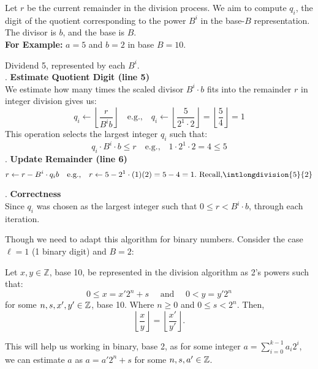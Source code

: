 \newpage

\begin{Proof}
    
    Let $r$ be the current remainder in the division process. We aim to compute $q_i$, the digit of the quotient corresponding to the power $B^i$ in the base-$B$ representation. The divisor is $b$, and the base is $B$.\\

    \noindent
    \textbf{For Example:} $a = 5$ and $b = 2$ in base $B = 10$.

    \noindent
    Dividend 5, represented by each $B^i$.\\

    . \textbf{Estimate Quotient Digit (line 5)}\\
    We estimate how many times the scaled divisor $B^i \cdot b$ fits into the remainder $r$ in integer division gives us:
    \[
    q_i \gets \left\lfloor \frac{r}{B^i b} \right\rfloor \quad \text{e.g.,} \quad q_i \gets \left\lfloor \frac{5}{2^1 \cdot 2} \right\rfloor = \left\lfloor \frac{5}{4} \right\rfloor = 1
    \]
    This operation selects the largest integer $q_i$ such that:
    \[
    q_i \cdot B^i \cdot b \leq r \quad \text{e.g.,} \quad 1 \cdot 2^1 \cdot 2 = 4 \leq 5
    \]
    . \textbf{Update Remainder (line 6)}\\
    \[
    r \gets r - B^i \cdot q_ib \quad \text{e.g.,} \quad r \gets 5 - 2^1 \cdot (1)(2) = 5 - 4 = 1.\text{ Recall,} \intlongdivision{5}{2}
    \]

    . \textbf{Correctness}\\
    Since $q_i$ was chosen as the largest integer such that $0 \leq r < B^i \cdot b$, through each iteration.

\end{Proof}
\noindent
Though we need to adapt this algorithm for binary numbers. Consider the case $\ell=1$ (1 binary digit) and $B=2$:

\begin{theo}
    
    Let $x,y\in\mathbb{Z}$, base 10, be represented in the division algorithm as 2's powers such that:
    \[0\leq x=x'2^n+s \quad \text{ and } \quad 0 < y = y'2^n\]
    \noindent
    for some $n,s,x',y'\in\mathbb{Z}$, base 10. Where $n\geq 0$ and $0\leq s < 2^n$. Then,
    \[
        \left\lfloor \frac{x}{y} \right\rfloor = \left\lfloor \frac{x'}{y'} \right\rfloor.
\]

\end{theo}
\noindent
This will help us working in binary, base 2, as for some integer $a=\sum_{i=0}^{k-1}a_i2^i$, we can estimate $a$ as $a=a'2^n+s$ for some $n,s,a'\in\mathbb{Z}$.

